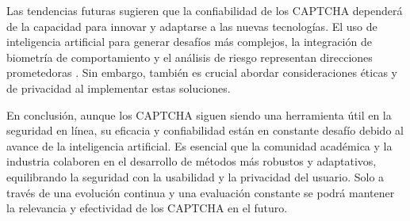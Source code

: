 \documentclass[conference]{IEEEtran}
\begin{document}
Las tendencias futuras sugieren que la confiabilidad de los CAPTCHA dependerá de la capacidad para innovar y adaptarse a las nuevas tecnologías. El uso de inteligencia artificial para generar desafíos más complejos, la integración de biometría de comportamiento y el análisis de riesgo representan direcciones prometedoras \cite{Sajjad2019, Murdoch2020}. Sin embargo, también es crucial abordar consideraciones éticas y de privacidad al implementar estas soluciones.

En conclusión, aunque los CAPTCHA siguen siendo una herramienta útil en la seguridad en línea, su eficacia y confiabilidad están en constante desafío debido al avance de la inteligencia artificial. Es esencial que la comunidad académica y la industria colaboren en el desarrollo de métodos más robustos y adaptativos, equilibrando la seguridad con la usabilidad y la privacidad del usuario. Solo a través de una evolución continua y una evaluación constante se podrá mantener la relevancia y efectividad de los CAPTCHA en el futuro.

\bigskip



\end{document}
